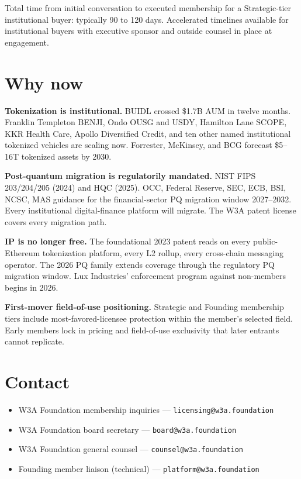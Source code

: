 \documentclass[11pt,letterpaper]{article}
\begin{document}
Total time from initial conversation to executed membership for a Strategic-tier institutional buyer: typically 90 to 120 days. Accelerated timelines available for institutional buyers with executive sponsor and outside counsel in place at engagement.

\section{Why now}

\textbf{Tokenization is institutional.} BUIDL crossed \$1.7B AUM in twelve months. Franklin Templeton BENJI, Ondo OUSG and USDY, Hamilton Lane SCOPE, KKR Health Care, Apollo Diversified Credit, and ten other named institutional tokenized vehicles are scaling now. Forrester, McKinsey, and BCG forecast \$5--16T tokenized assets by 2030.

\textbf{Post-quantum migration is regulatorily mandated.} NIST FIPS 203/204/205 (2024) and HQC (2025). OCC, Federal Reserve, SEC, ECB, BSI, NCSC, MAS guidance for the financial-sector PQ migration window 2027--2032. Every institutional digital-finance platform will migrate. The W3A patent license covers every migration path.

\textbf{IP is no longer free.} The foundational 2023 patent reads on every public-Ethereum tokenization platform, every L2 rollup, every cross-chain messaging operator. The 2026 PQ family extends coverage through the regulatory PQ migration window. Lux Industries' enforcement program against non-members begins in 2026.

\textbf{First-mover field-of-use positioning.} Strategic and Founding membership tiers include most-favored-licensee protection within the member's selected field. Early members lock in pricing and field-of-use exclusivity that later entrants cannot replicate.

\section{Contact}

\begin{itemize}
\item W3A Foundation membership inquiries --- \texttt{licensing@w3a.foundation}
\item W3A Foundation board secretary --- \texttt{board@w3a.foundation}
\item W3A Foundation general counsel --- \texttt{counsel@w3a.foundation}
\item Founding member liaison (technical) --- \texttt{platform@w3a.foundation}
\end{itemize}
\end{document}
